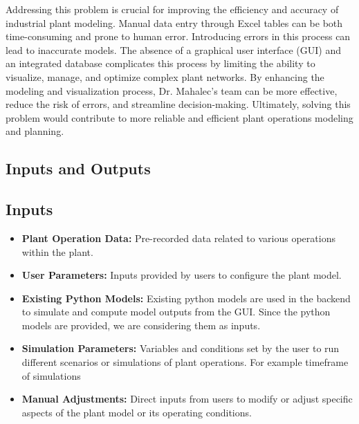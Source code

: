 \documentclass{article}
\begin{document}
Addressing this problem is crucial for improving the efficiency and accuracy of industrial plant modeling. Manual data entry through Excel tables can be both time-consuming and prone to human error. Introducing errors in this process can lead to inaccurate models. The absence of a graphical user interface (GUI) and an integrated database complicates this process by limiting the ability to visualize, manage, and optimize complex plant networks. By enhancing the modeling and visualization process, Dr. Mahalec's team can be more effective, reduce the risk of errors, and streamline decision-making. Ultimately, solving this problem would contribute to more reliable and efficient plant operations modeling and planning.
 
\subsection{Inputs and Outputs}

\subsection*{Inputs}
\begin{itemize}
    \item \textbf{Plant Operation Data:} Pre-recorded data related to various operations within the plant.
    \item \textbf{User Parameters:} Inputs provided by users to configure the plant model.
    \item \textbf{Existing Python Models:} Existing python models are used in the backend to simulate and compute model outputs from the GUI. Since the python models are provided, we are considering them as inputs.
    \item \textbf{Simulation Parameters:} Variables and conditions set by the user to run different scenarios or simulations of plant operations. For example timeframe of simulations
    \item \textbf{Manual Adjustments:} Direct inputs from users to modify or adjust specific aspects of the plant model or its operating conditions.
\end{itemize}
\end{document}
